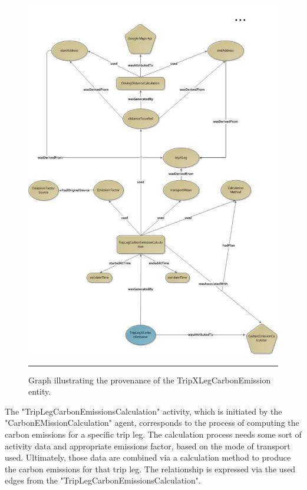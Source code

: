 \begin{figure}[htbp]
	\centering
		\includegraphics[scale=0.60]{./Figures/chapter3/figure2.pdf}
		\rule{35em}{0.5pt}
	\caption[Graph illustrating the provenance of the TripXLegCarbonEmission entity]{Graph illustrating the provenance of the TripXLegCarbonEmission entity.}
	\label{fig:provTripLegCo2Graph}
\end{figure}

The "TripLegCarbonEmissionsCalculation" activity, which is initiated by the "CarbonEMissionCalculation" agent, corresponds to the process of computing the carbon emissions for a specific trip leg.  The calculation process needs some sort of activity data and appropriate emissions factor, based on the mode of transport used. Ultimately, those data are combined via a calculation method to produce the carbon emissions for that trip leg. The relationship is expressed via the used edges from the "TripLegCarbonEmissionsCalculation".

